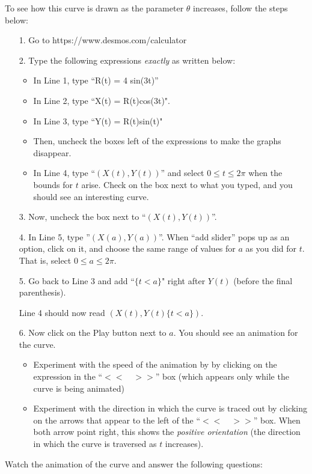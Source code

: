 \documentclass{ximera}
\begin{document}
\begin{exercise}
\begin{exercise}
To see how this curve is drawn as the parameter $\theta$ increases, follow the steps below:

\begin{itemize}
\item[1.] Go to https://www.desmos.com/calculator
\item[2.] Type the following expressions \emph{exactly} as written below:
\begin{itemize}
\item In Line 1, type ``R(t) = 4 sin(3t)''
\item In Line 2, type ``X(t) = R(t)cos(3t)".  
\item In Line 3, type ``Y(t) = R(t)sin(t)"
\item Then, uncheck the boxes left of the expressions to make the graphs disappear.
\item In Line 4, type ``$(X(t),Y(t))$'' and select $0\leq t \leq2\pi$ when the bounds for $t$ arise.  Check on the box next to what you typed, and you should see an interesting curve.
\end{itemize}
\item[3.] Now, uncheck the box next to ``$(X(t),Y(t))$''.
\item[4.] In Line 5, type ''$(X(a),Y(a))$''.  When ``add slider'' pops up as an option, click on it, and choose the same range of values for $a$ as you did for $t$.  That is, select $0 \leq a \leq 2\pi$.
\item[5.] Go back to Line 3 and add ``$\{t<a\}$" right after $Y(t)$ (before the final parenthesis).  

Line 4 should now read $(X(t),Y(t)\{t<a\} )$.

\item[6.] Now click on the Play button next to $a$.  You should see an animation for the curve.  
\begin{itemize}
\item Experiment with the speed of the animation by by clicking on the expression in the ``$<< \quad >>$'' box (which appears only while the curve is being animated)
\item Experiment with the direction in which the curve is traced out by clicking on the arrows that appear to the left of the ``$<< \quad >>$'' box.  When both arrow point right, this shows the \emph{positive orientation} (the direction in which the curve is traversed as $t$ increases).
\end{itemize}
\end{itemize}

Watch the animation of the curve and answer the following questions:


\end{exercise}
\end{exercise}
\end{document}
